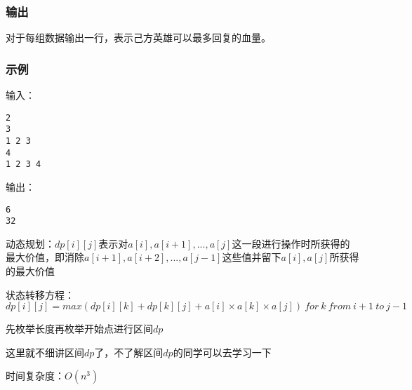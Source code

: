 \subsubsection{输出}
对于每组数据输出一行，表示己方英雄可以最多回复的血量。

\subsubsection{示例}
输入：
\begin{lstlisting}
2
3
1 2 3
4
1 2 3 4
\end{lstlisting}

输出：
\begin{lstlisting}
6
32
\end{lstlisting}

动态规划：$dp[i][j]$表示对$a[i],a[i + 1],...,a[j]$这一段进行操作时所获得的最大价值，即消除$a[i + 1],a[i + 2], ..., a[j - 1]$这些值并留下$a[i], a[j]$所获得的最大价值

状态转移方程：$dp[i][j] = max(dp[i][k] + dp[k][j] + a[i]\times a[k] \times a[j]) \ for \ k \ from \ i + 1 \ to \ j - 1$

先枚举长度再枚举开始点进行区间$dp$

这里就不细讲区间$dp$了，不了解区间$dp$的同学可以去学习一下

时间复杂度：$O(n^3)$
